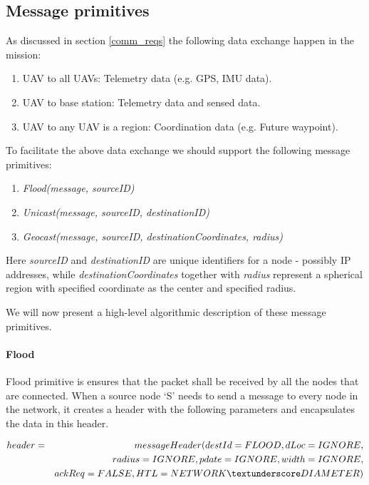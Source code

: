 \subsection{Message primitives} \label{message_primitives}

As discussed in section \ref{comm_reqs} the following data exchange happen in the mission:
\begin{enumerate}
    \item UAV to all UAVs: Telemetry data (e.g. GPS, IMU data).
    \item UAV to base station: Telemetry data and sensed data.
    \item UAV to any UAV is a region: Coordination data (e.g. Future waypoint).
\end{enumerate}

To facilitate the above data exchange we should support the following message primitives:
\begin{enumerate}
\item \emph{Flood(message, sourceID)}
\item \emph{Unicast(message, sourceID, destinationID)}
\item \emph{Geocast(message, sourceID, destinationCoordinates, radius)}
\end{enumerate}

Here \emph{sourceID} and \emph{destinationID} are unique identifiers for a node - possibly IP addresses, while \emph{destinationCoordinates} together with \emph{radius} represent a spherical region with specified coordinate as the center and specified radius.

We will now present a high-level algorithmic description of these message primitives.

\paragraph{Flood}

Flood primitive is ensures that the packet shall be received by all the nodes that are connected. When a source node `S' needs to send a message to every node in the network, it creates a header with the following parameters and encapsulates the data in this header.

\begin{eqnarray*}
& header = & messageHeader(destId = FLOOD, dLoc = IGNORE, \\
&    & radius = IGNORE, pdate = IGNORE, width = IGNORE, \\
&    & ackReq = FALSE, HTL = NETWORK\textunderscore DIAMETER)
\end{eqnarray*} 

